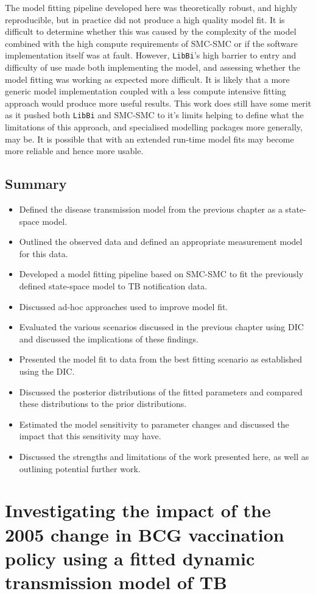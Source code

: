 \documentclass[11pt,twoside]{bristolthesis}
\providecommand{\tightlist}{%
  \setlength{\itemsep}{0pt}\setlength{\parskip}{0pt}}
\begin{document}
  The model fitting pipeline developed here was theoretically robust, and highly reproducible, but in practice did not produce a high quality model fit. It is difficult to determine whether this was caused by the complexity of the model combined with the high compute requirements of SMC-SMC or if the software implementation itself was at fault. However, \texttt{LibBi}'s high barrier to entry and difficulty of use made both implementing the model, and assessing whether the model fitting was working as expected more difficult. It is likely that a more generic model implementation coupled with a less compute intensive fitting approach would produce more useful results. This work does still have some merit as it pushed both \texttt{LibBi} and SMC-SMC to it's limits helping to define what the limitations of this approach, and specialised modelling packages more generally, may be. It is possible that with an extended run-time model fits may become more reliable and hence more usable.
  
  \hypertarget{summary-8}{%
  \section{Summary}\label{summary-8}}
  \begin{itemize}
  \tightlist
  \item
    Defined the disease transmission model from the previous chapter as a state-space model.
  \item
    Outlined the observed data and defined an appropriate measurement model for this data.
  \item
    Developed a model fitting pipeline based on SMC-SMC to fit the previously defined state-space model to TB notification data.
  \item
    Discussed ad-hoc approaches used to improve model fit.
  \item
    Evaluated the various scenarios discussed in the previous chapter using DIC and discussed the implications of these findings.
  \item
    Presented the model fit to data from the best fitting scenario as established using the DIC.
  \item
    Discussed the posterior distributions of the fitted parameters and compared these distributions to the prior distributions.
  \item
    Estimated the model sensitivity to parameter changes and discussed the impact that this sensitivity may have.
  \item
    Discussed the strengths and limitations of the work presented here, as well as outlining potential further work.
  \end{itemize}
  \hypertarget{model-results}{%
  \chapter{Investigating the impact of the 2005 change in BCG vaccination policy using a fitted dynamic transmission model of TB}\label{model-results}}
  
\end{document}
